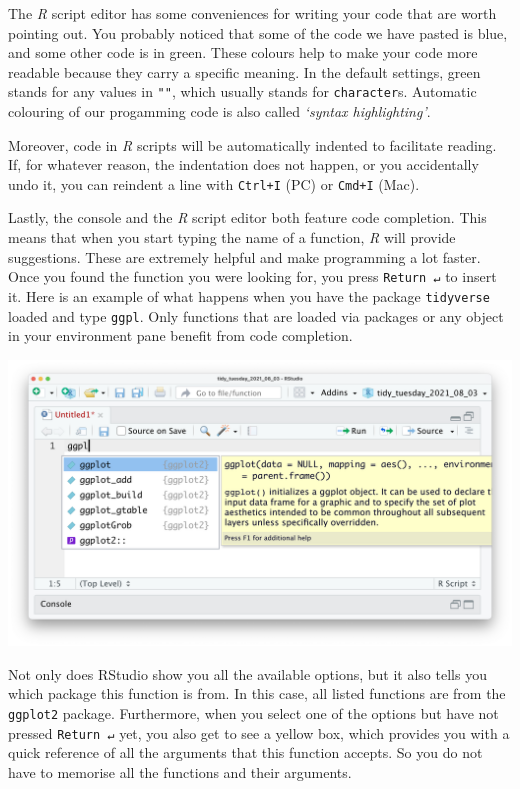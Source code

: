 \documentclass[
  letterpaper,
]{krantz}
\begin{document}
The \emph{R} script editor has some conveniences for writing your code
that are worth pointing out. You probably noticed that some of the code
we have pasted is blue, and some other code is in green. These colours
help to make your code more readable because they carry a specific
meaning. In the default settings, green stands for any values in
\texttt{""}, which usually stands for \texttt{character}s. Automatic
colouring of our progamming code is also called \emph{`syntax
highlighting'}.

Moreover, code in \emph{R} scripts will be automatically indented to
facilitate reading. If, for whatever reason, the indentation does not
happen, or you accidentally undo it, you can reindent a line with
\texttt{Ctrl+I} (PC) or \texttt{Cmd+I} (Mac).

Lastly, the console and the \emph{R} script editor both feature code
completion. This means that when you start typing the name of a
function, \emph{R} will provide suggestions. These are extremely helpful
and make programming a lot faster. Once you found the function you were
looking for, you press \texttt{Return\ ↵} to insert it. Here is an
example of what happens when you have the package \texttt{tidyverse}
loaded and type \texttt{ggpl}. Only functions that are loaded via
packages or any object in your environment pane benefit from code
completion.

\includegraphics{images/chapter_06_img/02_r_script/02_r_script_code_completion.png}

Not only does RStudio show you all the available options, but it also
tells you which package this function is from. In this case, all listed
functions are from the \texttt{ggplot2} package. Furthermore, when you
select one of the options but have not pressed \texttt{Return\ ↵} yet,
you also get to see a yellow box, which provides you with a quick
reference of all the arguments that this function accepts. So you do not
have to memorise all the functions and their arguments.
\end{document}
